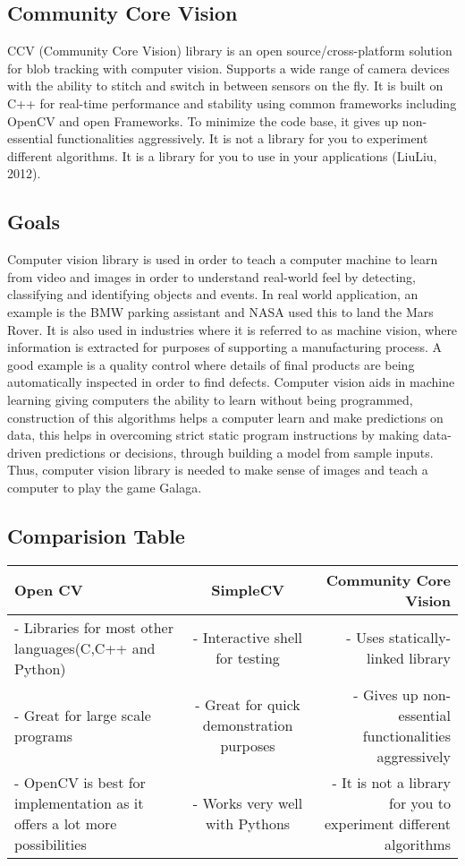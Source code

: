 \documentclass{scrreprt}
\begin{document}
\subsection{Community Core Vision}
CCV (Community Core Vision) library is an open source/cross-platform solution for blob tracking with computer vision.
Supports a wide range of camera devices with the ability to stitch and switch in between sensors on the fly.
It is built on C++ for real-time performance and stability using common frameworks including OpenCV and open Frameworks.
To minimize the code base, it gives up non-essential functionalities aggressively.
It is not a library for you to experiment different algorithms.
It is a library for you to use in your applications (LiuLiu, 2012).

\subsection{Goals}
Computer vision library is used in order to teach a computer machine to learn from video and images in order to understand real-world feel by detecting,
classifying and identifying objects and events.
In real world application, an example is the BMW parking assistant and NASA used this to land the Mars Rover.
It is also used in industries where it is referred to as machine vision, where information is extracted for purposes of supporting a manufacturing process.
A good example is a quality control where details of final products are being automatically inspected in order to find defects.
Computer vision aids in machine learning giving computers the ability to learn without being programmed,
construction of this algorithms helps a computer learn and make predictions on data,
this helps in overcoming strict static program instructions by making data-driven predictions or decisions,
through building a model from sample inputs.
Thus, computer vision library is needed to make sense of images and teach a computer to play the game Galaga.


\subsection{Comparision Table}
\begin{center}
  \begin{tabular}{| l | c | r |}
    \hline
    Open CV & SimpleCV & Community Core Vision \\ \hline
    \parbox{5cm}{- Libraries for most other languages(C,C++ and Python)} & \parbox{5cm}{- Interactive shell for testing} & \parbox{5cm}{- Uses statically-linked library} \\
    \parbox{5cm}{- Great for large scale programs} & \parbox{5cm}{- Great for quick demonstration purposes} & \parbox{5cm}{- Gives up non-essential functionalities aggressively} \\
    \parbox{5cm}{- OpenCV is best for implementation as it offers a lot more possibilities} & \parbox{5cm}{- Works very well with Pythons} & \parbox{5cm}{- It is not a library for you to experiment different algorithms} \\
    \hline
  \end{tabular}
\end{center}
\end{document}
